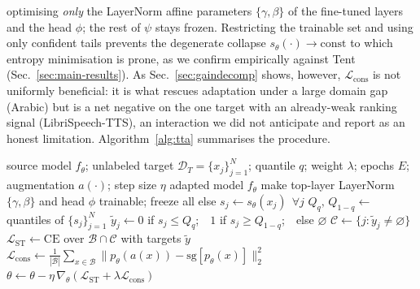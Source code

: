 \documentclass[conference]{IEEEtran}
\begin{document}
optimising \emph{only} the LayerNorm affine parameters $\{\gamma,\beta\}$ of the
fine-tuned layers and the head $\phi$; the rest of $\psi$ stays frozen. Restricting
the trainable set and using only confident tails prevents the degenerate collapse
$s_\theta(\cdot)\!\to\!\text{const}$ to which entropy minimisation is prone, as we
confirm empirically against Tent (Sec.~\ref{sec:main-results}). As
Sec.~\ref{sec:gaindecomp} shows, however, $\mathcal{L}_{\mathrm{cons}}$ is not
uniformly beneficial: it is what rescues adaptation under a large domain gap
(Arabic) but is a net negative on the one target with an already-weak ranking
signal (LibriSpeech-TTS), an interaction we did not anticipate and report as an
honest limitation. Algorithm~\ref{alg:tta} summarises the procedure.

\begin{algorithm}[t]
\caption{Real-manifold test-time adaptation (per target corpus)}
\label{alg:tta}
\begin{algorithmic}[1]
\Require source model $f_\theta$; unlabeled target $\mathcal{D}_T=\{x_j\}_{j=1}^{N}$;
quantile $q$; weight $\lambda$; epochs $E$; augmentation $a(\cdot)$; step size $\eta$
\Ensure adapted model $f_\theta$
\State make top-layer LayerNorm $\{\gamma,\beta\}$ and head $\phi$ trainable; freeze all else
  \State $s_j \gets s_\theta(x_j)\ \ \forall j$ 
  \State $Q_q,\,Q_{1-q}\gets$ quantiles of $\{s_j\}_{j=1}^{N}$
  \State $\tilde y_j \gets 0$ if $s_j\!\le\!Q_q$;\ \ $1$ if $s_j\!\ge\!Q_{1-q}$;\ \ else $\varnothing$
  \State $\mathcal{C}\gets\{j:\tilde y_j\neq\varnothing\}$ 
    \State $\mathcal{L}_{\mathrm{ST}}\gets\mathrm{CE}$ over $\mathcal{B}\cap\mathcal{C}$ with targets $\tilde y$ 
    \State $\mathcal{L}_{\mathrm{cons}}\gets\frac{1}{|\mathcal{B}|}\sum_{x\in\mathcal{B}}\|p_\theta(a(x))-\mathrm{sg}[p_\theta(x)]\|_2^2$
    \State $\theta\gets\theta-\eta\,\nabla_\theta(\mathcal{L}_{\mathrm{ST}}+\lambda\mathcal{L}_{\mathrm{cons}})$
  \EndFor
\EndFor
\end{algorithmic}
\end{algorithm}
\end{document}
